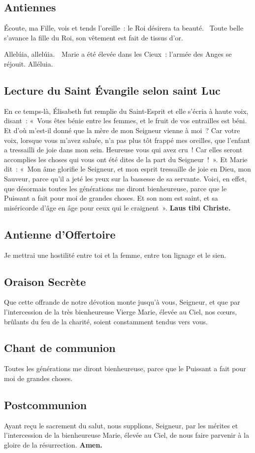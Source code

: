 \begin{multicols}{2}
\subsection*{Antiennes}
Écoute, ma Fille, vois et tends l’oreille : le Roi désirera ta beauté. \vb Toute belle s’avance la fille du Roi, son vêtement est fait de tissus d’or.

Allelúia, allelúia. \vb\ Marie a été élevée dans les Cieux : l’armée des Anges se réjouit. Alléluia.


\subsection*{Lecture du Saint Évangile selon saint Luc}
En ce temps-là, Élisabeth fut remplie du Saint-Esprit et elle s’écria à haute voix, disant : « Vous êtes bénie entre les femmes, et le fruit de vos entrailles est béni. Et d’où m’est-il donné que la mère de mon Seigneur vienne à moi ? Car votre voix, lorsque vous m’avez saluée, n’a pas plus tôt frappé mes oreilles, que l’enfant a tressailli de joie dans mon sein. Heureuse vous qui avez cru ! Car elles seront accomplies les choses qui vous ont été dites de la part du Seigneur ! ». Et Marie dit : « Mon âme glorifie le Seigneur, et mon esprit tressaille de joie en Dieu, mon Sauveur, parce qu’il a jeté les yeux sur la bassesse de sa servante. Voici, en effet, que désormais toutes les générations me diront bienheureuse, parce que le Puissant a fait pour moi de grandes choses. Et son nom est saint, et sa miséricorde d’âge en âge pour ceux qui le craignent ».
{\textbf {\rb\ Laus tibi Christe.}}

\subsection*{Antienne d'Offertoire}
Je mettrai une hostilité entre toi et la femme, entre ton lignage et le sien.

\subsection*{Oraison Secrète}
Que cette offrande de notre dévotion monte jusqu’à vous, Seigneur, et que par l’intercession de la très bienheureuse Vierge Marie, élevée au Ciel, nos cœurs, brûlants du feu de la charité, soient constamment tendus vers vous.

\subsection*{Chant de communion}
Toutes les générations me diront bienheureuse, parce que le Puissant a fait pour moi de grandes choses.

\subsection*{Postcommunion}
Ayant reçu le sacrement du salut, nous supplions, Seigneur, par les mérites et l’intercession de la bienheureuse Marie, élevée au Ciel, de nous faire parvenir à la gloire de la résurrection.
{\textbf {\rb\ Amen.}}
\end{multicols}